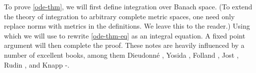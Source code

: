 \documentclass[12pt,reqno]{amsart}
\numberwithin{equation}{section}  %
\numberwithin{figure}{section}
\theoremstyle{plain}
\theoremstyle{definition}
\theoremstyle{remark}
\begin{document}
To prove \autoref{ode-thm}, we will first define
integration over Banach space. (To extend the theory of integration
to arbitrary complete metric spaces, one need only replace norms with metrics in
the definitions. We leave this to the reader.) Using which we will use to
rewrite \eqref{ode-thm-eq} as an integral equation. A fixed point
argument will then complete the proof. These notes are heavily influenced by a
number of excellent books, among them Dieudonn{\'e}
\cite{Dieudonne_1969_Foundations-of-}, Yosida \cite{Yosida:1980fk},
Folland \cite{Folland_1999_Real-analysis}, Jost
\cite{Jost-1998-Postmodern-analysis}, Rudin \cite{Rudin:1976uq}, and Knapp
\cite{Knapp:2005rm}-\cite{Knapp:2005yg}.
%
%
%
%
%
%
%
%
%
%
%
%
%
%
\end{document}
